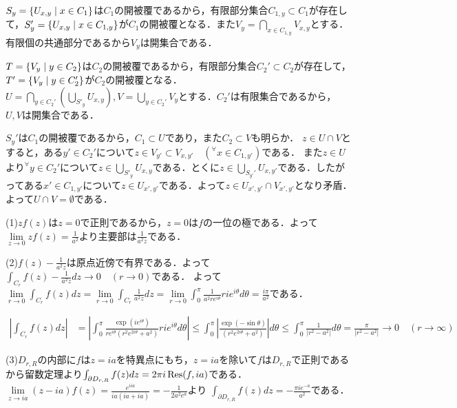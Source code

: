 \documentclass[
		book,
		head_space=20mm,
		foot_space=20mm,
		gutter=10mm,
		line_length=190mm
]{jlreq}
\begin{document}
$S_y=\left\{ U_{x,y}\mathrel{}\middle|\mathrel{} x \in C_1\right\}$は$C_1$の開被覆であるから，有限部分集合$C_{1,y}\subset C_1$が存在して，$S'_y =\left\{ U_{x,y}\mathrel{}\middle|\mathrel{} x \in C_{1,y}\right\}$が$C_1$の開被覆となる．また$V_y=\bigcap_{x\in C_{1,y}}V_{x,y}$とする．有限個の共通部分であるから$V_y$は開集合である．

$T=\left\{ V_y \mathrel{}\middle|\mathrel{} y \in C_2\right\}$は$C_2$の開被覆であるから，有限部分集合$C_2'\subset C_2$が存在して，$T'=\left\{ V_y \mathrel{}\middle|\mathrel{} y \in C_2'\right\}$が$C_2$の開被覆となる．$U=\bigcap\limits_{y\in C_2'} ( \bigcup\limits_{S'_y} U_{x,y} ),V=\bigcup\limits_{y\in C_2'} V_y$とする．$C_2'$は有限集合であるから，$U,V$は開集合である．

$S_y'$は$C_{1}$の開被覆であるから，$C_1\subset U$であり，また$C_2 \subset V$も明らか．
$z \in U\cap V$とすると，ある$y' \in C_2'$について$z \in V_{y'} \subset V_{x,y'}\quad (^\forall x\in C_{1,y'})$である．
また$z \in U$より${}^\forall y \in C_2'$について$z \in  \bigcup\limits_{S'_y} U_{x,y} $である．とくに$z \in \bigcup\limits_{S_{y'}'} U_{x,y'}$である．したがってある$x' \in C_{1,y'}$について$z \in U_{x',y'}$である．よって$z \in U_{x',y'}\cap V_{x',y'}$となり矛盾．よって$U\cap V=\emptyset$である．

(1)$zf(z)$は$z=0$で正則であるから，$z=0$は$f$の一位の極である．よって$\lim\limits_{z\to 0}zf(z)=\frac{1}{a^2}$より主要部は$\frac{1}{a^2z}$である．

(2)$f(z)-\frac{1}{a^2z}$は原点近傍で有界である．よって$\int_{C_r} f(z)-\frac{1}{a^2z}dz\rightarrow 0 \quad (r\rightarrow 0)$である．
よって$\lim\limits_{r \rightarrow 0}\int_{C_r} f(z)dz=\lim\limits_{r \rightarrow 0}\int_{C_r} \frac{1}{a^2z}dz=\lim\limits_{r \rightarrow 0}\int_0^\pi \frac{1}{a^2re^{i\theta}}rie^{i\theta}d\theta=\frac{i\pi}{a^2}$である．

\begin{align}
    \left| \int_{C_r}f(z)dz \right|&= \left| \int_0^\pi \frac{\exp(ie^{i\theta})}{re^{i\theta}(r^2e^{2i\theta}+a^2)}rie^{i\theta}d\theta \right|\le \int_0^\pi \left| \frac{\exp(-\sin \theta)}{(r^2e^{2i\theta}+a^2)} \right|d\theta\le \int_0^\pi \frac{1}{|r^2-a^2|}d\theta=\frac{\pi}{|r^2-a^2|}\rightarrow 0 \quad (r\rightarrow \infty)
\end{align}

(3)$D_{r,R}$の内部に$f$は$z=ia$を特異点にもち，$z=ia$を除いて$f$は$D_{r,R}$で正則であるから留数定理より$\int_{\partial D_{r,R}}f(z)dz=2\pi i \Res(f,ia)$である．
$\lim\limits_{z \to ia} (z-ia)f(z)=\frac{e^{iia}}{ia(ia+ia)}=-\frac{1}{2a^2e^a}$より
$\int_{\partial D_{r,R}}f(z)dz= -\frac{\pi ie^{-a}}{a^2}$である．
\end{document}
